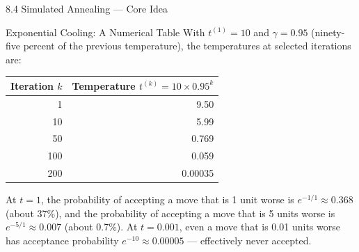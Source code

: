 \documentclass[aspectratio=169,10pt]{beamer}
\begin{document}
\begin{frame}[allowframebreaks]{8.4 Simulated Annealing --- Core Idea}
\begin{exampleblock}{Exponential Cooling: A Numerical Table}
With $t^{(1)} = 10$ and $\gamma = 0.95$ (ninety-five percent of the previous temperature), the temperatures at selected iterations are:
\begin{center}
\begin{tabular}{rr}
\toprule
Iteration $k$ & Temperature $t^{(k)} = 10 \times 0.95^k$ \\
\midrule
1   & 9.50 \\
10  & 5.99 \\
50  & 0.769 \\
100 & 0.059 \\
200 & 0.00035 \\
\bottomrule
\end{tabular}
\end{center}
At $t = 1$, the probability of accepting a move that is 1 unit worse is $e^{-1/1} \approx 0.368$ (about 37\%), and the probability of accepting a move that is 5 units worse is $e^{-5/1} \approx 0.007$ (about 0.7\%). At $t = 0.001$, even a move that is 0.01 units worse has acceptance probability $e^{-10} \approx 0.00005$ --- effectively never accepted.
\end{exampleblock}

\end{frame}
\end{document}
